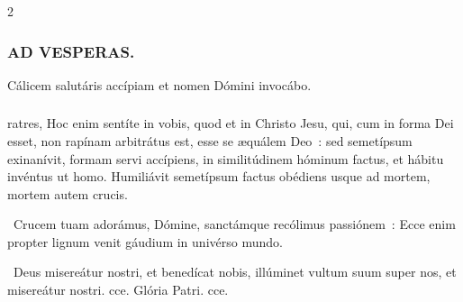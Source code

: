 \documentclass[9pt,twoside]{extarticle}
\begin{document}
\begin{multicols}{2}
\subsubsection*{\center \textsc{AD VESPERAS.}}
\begin{tightlist}{}
\item {} Cálicem salutáris accípiam et nomen Dómini invocábo.
\item {}
\end{tightlist}
\subsubsection*{}
ratres, Hoc enim sentíte in vobis, quod et in Christo Jesu, qui, cum in forma Dei esset, non rapínam arbitrátus est, esse se æquálem Deo~: sed semetípsum exinanívit, formam servi accípiens, in similitúdinem hóminum factus, et hábitu invéntus ut homo. Humiliávit semetípsum factus obédiens usque ad mortem, mortem autem crucis.

\begin{tightlist}{}
\item {}~Crucem tuam adorámus, Dómine, sanctámque recólimus passiónem~: \textred{*} Ecce enim propter lignum venit gáudium in univérso mundo. 
\item {}~Deus misereátur nostri, et benedícat nobis, illúminet vultum suum super nos, et misereátur nostri. cce. Glória Patri. cce.
\end{tightlist}

\end{multicols}
\end{document}
